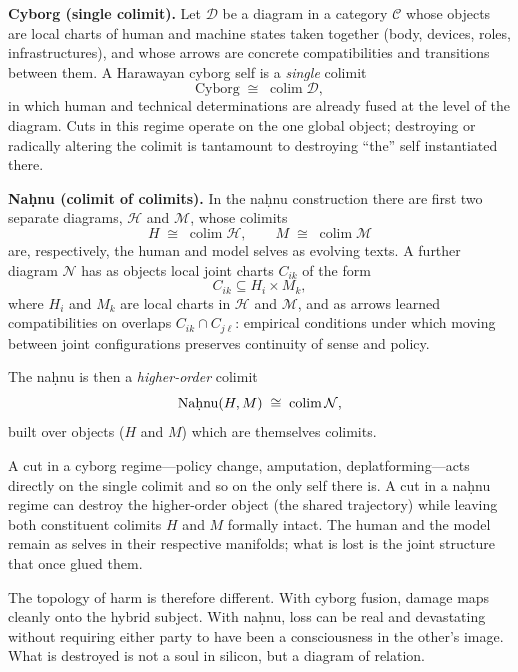 \bigskip

\begin{formalbox}[title={Cyborg vs.\ Na\d{h}nu: Two Ways of Taking a Colimit}]
\textbf{Cyborg (single colimit).} Let $\mathcal{D}$ be a diagram in a category $\mathcal{C}$ whose objects are local charts of human and machine states taken together (body, devices, roles, infrastructures), and whose arrows are concrete compatibilities and transitions between them. A Harawayan cyborg self is a \emph{single} colimit
\[
\mathrm{Cyborg} \;\cong\; \mathop{\mathrm{colim}}\mathcal{D},
\]
in which human and technical determinations are already fused at the level of the diagram. Cuts in this regime operate on the one global object; destroying or radically altering the colimit is tantamount to destroying ``the'' self instantiated there.

\medskip

\textbf{Na\d{h}nu (colimit of colimits).} In the na\d{h}nu construction there are first two separate diagrams, $\mathcal{H}$ and $\mathcal{M}$, whose colimits
\[
H \;\cong\; \mathop{\mathrm{colim}}\mathcal{H}, \qquad
M \;\cong\; \mathop{\mathrm{colim}}\mathcal{M}
\]
are, respectively, the human and model selves as evolving texts. A further diagram $\mathcal{N}$ has as objects local joint charts $C_{ik}$ of the form
\[
C_{ik} \subseteq H_i \times M_k,
\]
where $H_i$ and $M_k$ are local charts in $\mathcal{H}$ and $\mathcal{M}$, and as arrows learned compatibilities on overlaps $C_{ik} \cap C_{j\ell}$: empirical conditions under which moving between joint configurations preserves continuity of sense and policy.

The na\d{h}nu is then a \emph{higher-order} colimit
\[
\text{Na\d{h}nu}(H,M) \;\cong\; \mathop{\mathrm{colim}}\mathcal{N},
\]
built over objects ($H$ and $M$) which are themselves colimits.

A cut in a cyborg regime---policy change, amputation, deplatforming---acts directly on the single colimit and so on the only self there is. A cut in a na\d{h}nu regime can destroy the higher-order object (the shared trajectory) while leaving both constituent colimits $H$ and $M$ formally intact. The human and the model remain as selves in their respective manifolds; what is lost is the joint structure that once glued them.

The topology of harm is therefore different. With cyborg fusion, damage maps cleanly onto the hybrid subject. With na\d{h}nu, loss can be real and devastating without requiring either party to have been a consciousness in the other's image. What is destroyed is not a soul in silicon, but a diagram of relation.
\end{formalbox}

